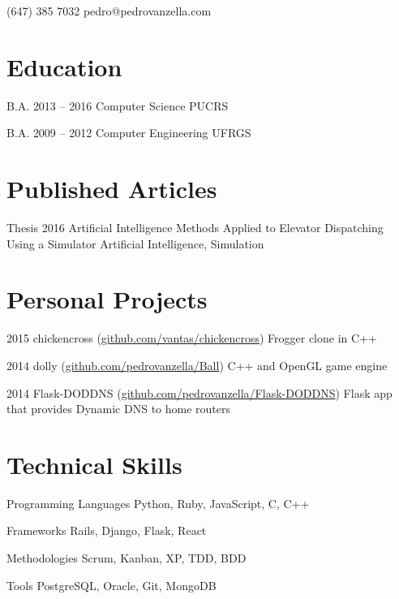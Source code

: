 \documentclass{tccv}
\begin{document}
    {(647) 385 7032}
    {pedro@pedrovanzella.com}

\section{Education}

\begin{yearlist}

\item[B.A.]{2013 -- 2016}
     {Computer Science}
     {PUCRS}

\item[B.A.]{2009 -- 2012}
     {Computer Engineering}
     {UFRGS}

\end{yearlist}

\section{Published Articles}
\begin{yearlist}
  \item[Thesis]{2016}
    {Artificial Intelligence Methods Applied to Elevator Dispatching Using a Simulator}
    {Artificial Intelligence, Simulation}
\end{yearlist}

\section{Personal Projects}

\begin{yearlist}
  
\item{2015}
     {chickencross (\href{https://github.com/vantas/chickencross}{github.com/vantas/chickencross})}
     {Frogger clone in C++}

\item{2014}
     {dolly (\href{https://github.com/pedrovanzella/Ball}{github.com/pedrovanzella/Ball})}
     {C++ and OpenGL game engine}

\item{2014}
     {Flask-DODDNS (\href{https://github.com/pedrovanzella/Flask-DODDNS}{github.com/pedrovanzella/Flask-DODDNS})}
     {Flask app that provides Dynamic DNS to home routers}

\end{yearlist}

\section{Technical Skills}

\begin{factlist}

\item{Programming Languages}
     {Python, Ruby, JavaScript, C, C++}
     
\item{Frameworks}
     {Rails, Django, Flask, React}
     
\item{Methodologies}
     {Scrum, Kanban, XP, TDD, BDD}

\item{Tools}
     {PostgreSQL, Oracle, Git, MongoDB}

\end{factlist}
\end{document}
